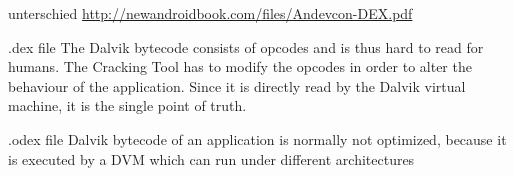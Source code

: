 unterschied \url{http://newandroidbook.com/files/Andevcon-DEX.pdf}\newline

.dex file
The Dalvik bytecode consists of opcodes and is thus hard to read for humans. The Cracking Tool has to modify the opcodes in order to alter the behaviour of the application. Since it is directly read by the Dalvik virtual machine, it is the single point of truth.\newline

.odex file
Dalvik bytecode of an application is normally not optimized, because it is executed by a DVM which can run under different architectures\newline
